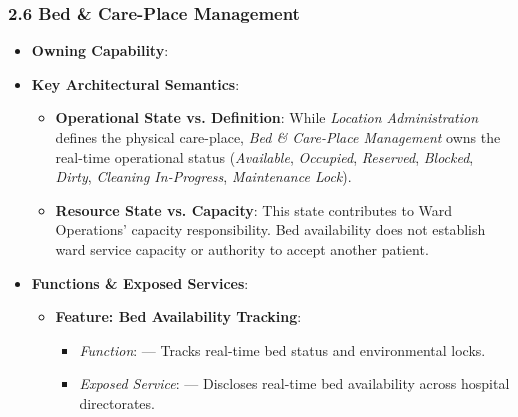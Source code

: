 \par\smallskip
{}\label{rad:hso:150}
\subsubsection*{2.6 Bed \& Care-Place Management}
\label{rad:hso:151}

\begin{itemize}

\item 
\textbf{Owning Capability}: \texttt{}



\item 
\textbf{Key Architectural Semantics}:


\begin{itemize}

\item 
\textbf{Operational State vs. Definition}: While \emph{Location Administration} defines the physical care-place, \emph{Bed \& Care-Place Management} owns the real-time operational status (\emph{Available}, \emph{Occupied}, \emph{Reserved}, \emph{Blocked}, \emph{Dirty}, \emph{Cleaning In-Progress}, \emph{Maintenance Lock}).



\item 
\textbf{Resource State vs. Capacity}: This state contributes to Ward Operations' capacity responsibility. Bed availability does not establish ward service capacity or authority to accept another patient.



\end{itemize}


\item 
\textbf{Functions \& Exposed Services}:


\begin{itemize}

\item 
\textbf{Feature: Bed Availability Tracking}:


\begin{itemize}

\item 
\emph{Function}: \texttt{} — Tracks real-time bed status and environmental locks.



\item 
\emph{Exposed Service}: \texttt{} — Discloses real-time bed availability across hospital directorates.




\end{itemize}
\end{itemize}
\end{itemize}
